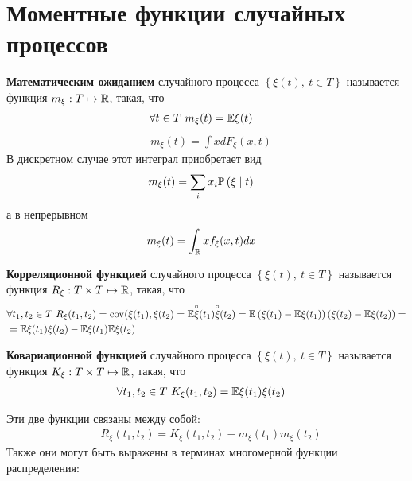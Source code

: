 \newpage
{}
\section{Моментные функции случайных процессов}
\begin{Def}
    \textbf{Математическим ожиданием} случайного процесса $\left\{\xi(t), \ t \in T\right\}$ называется функция $m_\xi: T \mapsto \mathbb{R}$, такая, что
    \begin{align*}
      & \forall t \in T \ m_\xi(t) = \mathbb{E} \xi(t)
    \end{align*}
    \begin{align*}
      & m_\xi(t) = \int xdF_\xi(x,t)
    \end{align*}
    В дискретном случае этот интеграл приобретает вид
    \begin{align*}
      & m_\xi(t) = \sum_i x_i \mathbb{P}\left(\xi \mid t\right)
    \end{align*}
    а в непрерывном
    \begin{align*}
      & m_\xi(t) = \int_{\mathbb{R}} xf_\xi(x,t) dx
    \end{align*}
\end{Def}
\begin{Def}
    \textbf{Корреляционной функцией} случайного процесса $\left\{\xi(t), \ t \in T\right\}$ называется функция $R_\xi: T\times T \mapsto \mathbb{R}$, такая, что
    \begin{align*}
      & \forall t_1, t_2 \in T \ R_\xi(t_1, t_2) = \operatorname{cov}(\xi(t_1), \xi(t_2) = \mathbb{E} \overset{\circ}{\xi}(t_1)\overset{\circ}{\xi}(t_2) = \mathbb{E} \left(\xi(t_1) - \mathbb{E} \xi(t_1)\right)\left(\xi(t_2) - \mathbb{E} \xi(t_2)\right) = \\
      & = \mathbb{E} \xi(t_1)\xi(t_2) - \mathbb{E} \xi(t_1) \mathbb{E} \xi(t_2)
    \end{align*}
\end{Def}
\begin{Def}
    \textbf{Ковариационной функцией} случайного процесса $\left\{\xi(t), \ t \in T\right\}$ называется функция $K_\xi: T\times T \mapsto \mathbb{R}$, такая, что
    \begin{align*}
      & \forall t_1, t_2 \in T \ K_\xi(t_1, t_2) = \mathbb{E} \xi(t_1)\xi(t_2)
    \end{align*}
\end{Def}
Эти две функции связаны между собой:
\begin{align*}
  & R_\xi(t_1, t_2) = K_\xi(t_1, t_2) - m_\xi(t_1)m_\xi(t_2)
\end{align*}
Также они могут быть выражены в терминах многомерной функции распределения:
